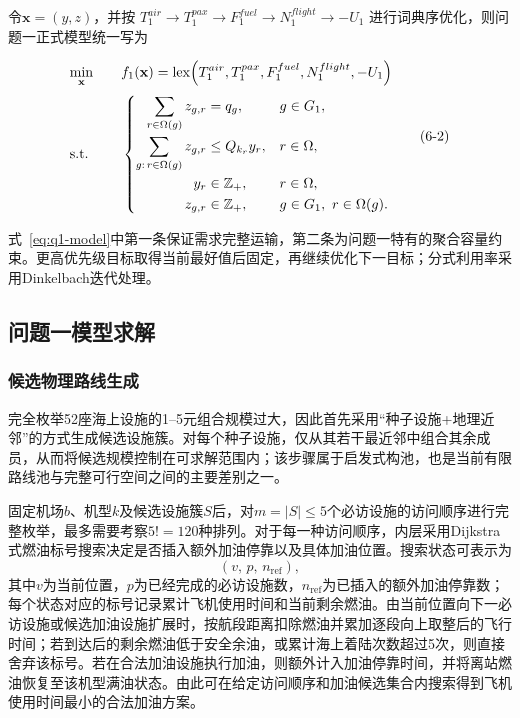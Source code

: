 令$\mathbf{x}=(y,z)$，并按
$T_1^{air}\rightarrow T_1^{pax}\rightarrow F_1^{fuel}\rightarrow N_1^{flight}\rightarrow -U_1$
进行词典序优化，则问题一正式模型统一写为

\[
\begin{array}{@{}l@{\qquad}c@{}}
\displaystyle \min_{\mathbf{x}}
&
\displaystyle
f_1(\mathbf{x})
=
\operatorname{lex}\!\left(
T_1^{air},T_1^{pax},F_1^{fuel},N_1^{flight},-U_1
\right)
\\[1.0em]
\mathrm{s.t.}
&
\left\{
\begin{aligned}
\sum_{r\in\Omega(g)} z_{g,r} &= q_g,
&& g\in G_1,\\
\sum_{g:\,r\in\Omega(g)} z_{g,r} &\le Q_{k_r}y_r,
&& r\in\Omega,\\
y_r &\in\mathbb Z_+,
&& r\in\Omega,\\
z_{g,r} &\in\mathbb Z_+,
&& g\in G_1,\ r\in\Omega(g).
\end{aligned}
\right.
\end{array}
\tag{6-2}\label{eq:q1-model}
\]

式~\eqref{eq:q1-model}中第一条保证需求完整运输，第二条为问题一特有的聚合容量约束。更高优先级目标取得当前最好值后固定，再继续优化下一目标；分式利用率采用Dinkelbach迭代处理。

\subsection{问题一模型求解}\label{subsec:q1-solution}

\subsubsection{候选物理路线生成}

完全枚举52座海上设施的1--5元组合规模过大，因此首先采用“种子设施+地理近邻”的方式生成候选设施簇。对每个种子设施，仅从其若干最近邻中组合其余成员，从而将候选规模控制在可求解范围内；该步骤属于启发式构池，也是当前有限路线池与完整可行空间之间的主要差别之一。

固定机场$b$、机型$k$及候选设施簇$S$后，对$m=|S|\le5$个必访设施的访问顺序进行完整枚举，最多需要考察$5!=120$种排列。对于每一种访问顺序，内层采用Dijkstra式燃油标号搜索决定是否插入额外加油停靠以及具体加油位置。搜索状态可表示为
\[
(v,\,p,\,n_{\mathrm{ref}}),
\]
其中$v$为当前位置，$p$为已经完成的必访设施数，$n_{\mathrm{ref}}$为已插入的额外加油停靠数；每个状态对应的标号记录累计飞机使用时间和当前剩余燃油。由当前位置向下一必访设施或候选加油设施扩展时，按航段距离扣除燃油并累加逐段向上取整后的飞行时间；若到达后的剩余燃油低于安全余油，或累计海上着陆次数超过5次，则直接舍弃该标号。若在合法加油设施执行加油，则额外计入加油停靠时间，并将离站燃油恢复至该机型满油状态。由此可在给定访问顺序和加油候选集合内搜索得到飞机使用时间最小的合法加油方案。

